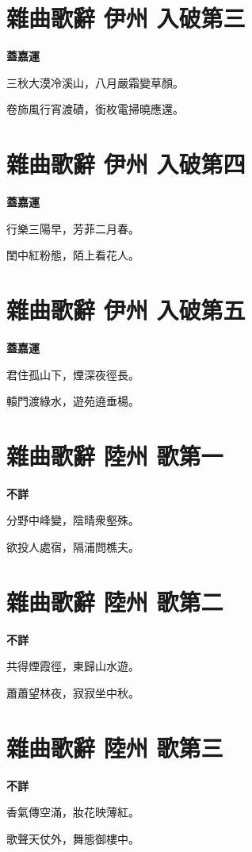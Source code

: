 \documentclass[12pt,a4paper]{ctexbook}
\begin{document}
\section{雜曲歌辭 伊州 入破第三}
\textbf{蓋嘉運}\par\vspace{0.5em}
三秋大漠冷溪山，八月嚴霜變草顏。\par
卷斾風行宵渡磧，銜枚電掃曉應還。\par

\section{雜曲歌辭 伊州 入破第四}
\textbf{蓋嘉運}\par\vspace{0.5em}
行樂三陽早，芳菲二月春。\par
閨中紅粉態，陌上看花人。\par

\section{雜曲歌辭 伊州 入破第五}
\textbf{蓋嘉運}\par\vspace{0.5em}
君住孤山下，煙深夜徑長。\par
轅門渡綠水，遊苑遶垂楊。\par

\section{雜曲歌辭 陸州 歌第一}
\textbf{不詳}\par\vspace{0.5em}
分野中峰變，陰晴衆壑殊。\par
欲投人處宿，隔浦問樵夫。\par

\section{雜曲歌辭 陸州 歌第二}
\textbf{不詳}\par\vspace{0.5em}
共得煙霞徑，東歸山水遊。\par
蕭蕭望林夜，寂寂坐中秋。\par

\section{雜曲歌辭 陸州 歌第三}
\textbf{不詳}\par\vspace{0.5em}
香氣傳空滿，妝花映薄紅。\par
歌聲天仗外，舞態御樓中。\par
\end{document}
